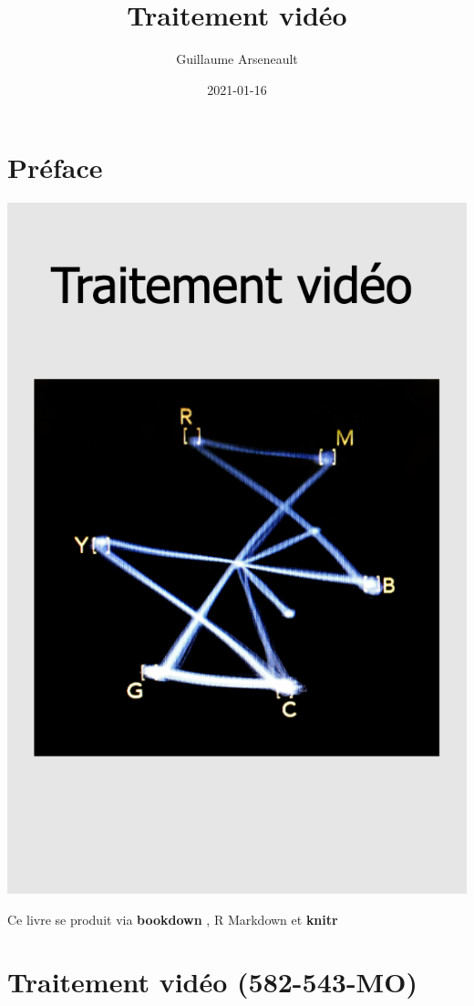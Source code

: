 \documentclass[
]{book}
\title{Traitement vidéo}
\author{Guillaume Arseneault}
\date{2021-01-16}
\begin{document}
\maketitle

{
\setcounter{tocdepth}{1}
\tableofcontents
}
\listoftables
\listoffigures
\hypertarget{pruxe9face}{%
\chapter{Préface}\label{pruxe9face}}

\includegraphics{images/cover.png}

Ce livre se produit via \textbf{bookdown} \citep{rmarkdown2018}, R Markdown et \textbf{knitr} \citep{xie2015}

\hypertarget{traitement-viduxe9o-582-543-mo}{%
\chapter{Traitement vidéo (582-543-MO)}\label{traitement-viduxe9o-582-543-mo}}
\end{document}
